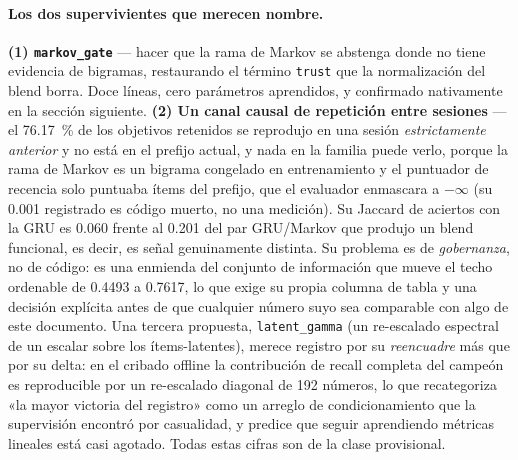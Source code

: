 \documentclass[11pt]{article}
\begin{document}
\paragraph{Los dos supervivientes que merecen nombre.} \textbf{(1)
\texttt{markov\_gate}} --- hacer que la rama de Markov se abstenga donde no tiene
evidencia de bigramas, restaurando el término \texttt{trust} que la normalización
del blend borra. Doce líneas, cero parámetros aprendidos, y confirmado nativamente
en la sección siguiente. \textbf{(2) Un canal causal de repetición entre
sesiones} --- el \SI{76.17}{\percent} de los objetivos retenidos se reprodujo en una
sesión \emph{estrictamente anterior} y no está en el prefijo actual, y nada en la
familia puede verlo, porque la rama de Markov es un bigrama congelado en
entrenamiento y el puntuador de recencia solo puntuaba ítems del prefijo, que el
evaluador enmascara a $-\infty$ (su \num{0.001} registrado es código muerto, no una
medición). Su Jaccard de aciertos con la GRU es \num{0.060} frente al \num{0.201}
del par GRU/Markov que produjo un blend funcional, es decir, es señal
genuinamente distinta. Su problema es de \emph{gobernanza}, no de código: es una
enmienda del conjunto de información que mueve el techo ordenable de \num{0.4493}
a \num{0.7617}, lo que exige su propia columna de tabla y una decisión explícita
antes de que cualquier número suyo sea comparable con algo de este documento. Una
tercera propuesta, \texttt{latent\_gamma} (un re-escalado espectral de un escalar
sobre los ítems-latentes), merece registro por su \emph{reencuadre} más que por su
delta: en el cribado offline la contribución de recall completa del campeón es
reproducible por un re-escalado diagonal de \num{192} números, lo que recategoriza
«la mayor victoria del registro» como un arreglo de condicionamiento que la
supervisión encontró por casualidad, y predice que seguir aprendiendo métricas
lineales está casi agotado. Todas estas cifras son de la clase provisional.
\end{document}
